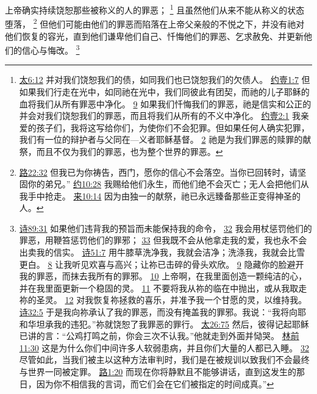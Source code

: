 \documentclass[12pt, a4paper, oneside]{ctexart}
\newcounter{parnum}[section]
\newcommand{\N}{%
   \noindent\refstepcounter{parnum}%
    \makebox[\parindent][l]{\textbf{\arabic{parnum}.}}}
\begin{document}
\N 上帝确实持续饶恕那些被称义的人的罪恶；
	\footnote {
		\href{https://biblehub.com/matthew/6-12.htm}{太6:12} 并对我们饶恕我们的债，如同我们也已饶恕我们的欠债人。
		\href{https://biblehub.com/1_john/1-7.htm}{约壹1:7} 但如果我们行走在光中，如同祂在光中，我们同彼此有团契，而祂的儿子耶稣的血将我们从所有罪恶中净化。
		\href{https://biblehub.com/1_john/1-9.htm}{9} 如果我们忏悔我们的罪恶，祂是信实和公正的并会对我们饶恕我们的罪恶，而且将我们从所有的不义中净化。
		\href{https://biblehub.com/1_john/2-1.htm}{约壹2:1} 我亲爱的孩子们，我将这写给你们，为使你们不会犯罪。但如果任何人确实犯罪，我们有一位的辩护者与父同在---义者耶稣基督。
		\href{https://biblehub.com/1_john/2-2.htm}{2} 祂是为我们罪恶的赎罪的献祭，而且不仅为我们的罪恶，也为整个世界的罪恶。
	}
	且虽然他们从来不能从称义的状态堕落，
	\footnote {
		\href{https://biblehub.com/luke/22-32.htm}{路22:32} 但我已为你祷告，西门，愿你的信心不会落空。当你已回转时，请坚固你的弟兄。”
		\href{https://biblehub.com/john/10-28.htm}{约10:28} 我赐给他们永生，而他们绝不会灭亡；无人会把他们从我手中抢走。
		\href{https://biblehub.com/hebrews/10-14.htm}{来10:14} 因为由独一的献祭，祂已永远臻备那些正变得神圣的人。
	}
	但他们可能由他们的罪恶而陷落在上帝父亲般的不悦之下，并没有祂对他们恢复的容光，直到他们谦卑他们自己、忏悔他们的罪恶、乞求赦免、并更新他们的信心与悔改。
	\footnote {
		\href{https://biblehub.com/psalms/89-31.htm}{诗89:31} 如果他们违背我的预旨而未能保持我的命令，
		\href{https://biblehub.com/psalms/89-32.htm}{32} 我会用杖惩罚他们的罪恶，用鞭笞惩罚他们的罪邪；
		\href{https://biblehub.com/psalms/89-33.htm}{33} 但我既不会从他拿走我的爱，我也永不会出卖我的信实。
		\href{https://biblehub.com/psalms/51-7.htm}{诗51:7} 用牛膝草洗净我，我就会洁净；洗涤我，我就会比雪更白。
		\href{https://biblehub.com/psalms/51-8.htm}{8} 让我听见欢喜与高兴；让祢已击碎的骨头欢欣。
		\href{https://biblehub.com/psalms/51-9.htm}{9} 隐藏你的脸避开我的罪恶，而抹去我所有的罪邪。
		\href{https://biblehub.com/psalms/51-10.htm}{10} 上帝啊，在我里面创造一颗纯洁的心，并在我里面更新一个稳固的灵。
		\href{https://biblehub.com/psalms/51-11.htm}{11} 不要将我从祢的临在中抛出，或从我取走祢的圣灵。
		\href{https://biblehub.com/psalms/51-12.htm}{12} 对我恢复祢拯救的喜乐，并准予我一个甘愿的灵，以维持我。
		\href{https://biblehub.com/psalms/32-5.htm}{诗32:5} 于是我向祢承认了我的罪恶，而没有掩盖我的罪邪。我说：“我将向耶和华坦承我的违犯。”祢就饶恕了我罪恶的罪行。
		\href{https://biblehub.com/matthew/26-75.htm}{太26:75} 然后，彼得记起耶稣已讲的言：“公鸡打鸣之前，你会三次不认我。”他就走到外面并恸哭。
		\href{https://biblehub.com/1_corinthians/11-30.htm}{林前11:30} 这是为什么你们中间许多人软弱患病，并且你们大量的人都已入睡。
		\href{https://biblehub.com/1_corinthians/11-32.htm}{32} 尽管如此，当我们被主以这种方法审判时，我们是在被规训以致我们不会最终与世界一同被定罪。
		\href{https://biblehub.com/luke/1-20.htm}{路1:20} 而现在你将静默且不能够讲话，直到这发生的那日，因为你不相信我的言词，而它们会在它们被指定的时间成真。”
	}
\end{document}
